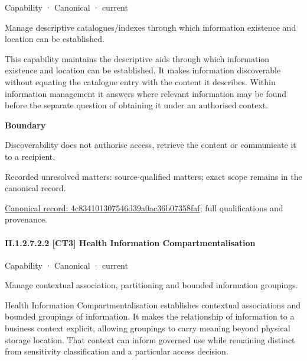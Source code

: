 \label{element:4c834101307546d39a0ac36b07358faf}
{\small Capability · Canonical · current}\par

Manage descriptive catalogues/indexes through which information existence and location can be established.



This capability maintains the descriptive aids through which information existence and location can be established. It makes information discoverable without equating the catalogue entry with the content it describes. Within information management it answers where relevant information may be found before the separate question of obtaining it under an authorised context.



\textbf{Boundary}



Discoverability does not authorise access, retrieve the content or communicate it to a recipient.


{\small Recorded unresolved matters: source-qualified matters; exact scope remains in the canonical record.}\par
{\footnotesize \href{../../../../continuum/strategy/capability/4c834101307546d39a0ac36b07358faf.md}{Canonical record: 4c834101307546d39a0ac36b07358faf}; full qualifications and provenance.}\par
\paragraph*{II.1.2.7.2.2 [CT3] Health Information Compartmentalisation}
\label{navigation:II.1.2.7.2.2}

\label{element:660d78d6a34041939d1c290266d47f03}
{\small Capability · Canonical · current}\par

Manage contextual association, partitioning and bounded information groupings.



Health Information Compartmentalisation establishes contextual associations and bounded groupings of information. It makes the relationship of information to a business context explicit, allowing groupings to carry meaning beyond physical storage location. That context can inform governed use while remaining distinct from sensitivity classification and a particular access decision.




